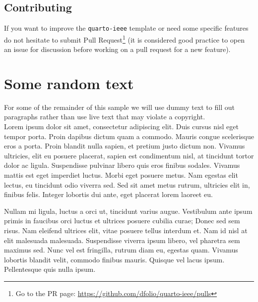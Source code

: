 \documentclass[
  journal,
]{IEEEtran}%
\theoremstyle{plain}
\theoremstyle{remark}
\begin{document}
\subsection{Contributing}\label{contributing}

If you want to improve the \texttt{quarto-ieee} template or need some
specific features do not hesitate to submit Pull Request\footnote{Go to
  the PR page: \url{https://github.com/dfolio/quarto-ieee/pulls}} (it is
considered good practice to open an issue for discussion before working
on a pull request for a new feature).

\section{Some random text}\label{some-random-text}

For some of the remainder of this sample we will use dummy text to fill
out paragraphs rather than use live text that may violate a copyright.
\IEEEpubidadjcol\\
Lorem ipsum dolor sit amet, consectetur adipiscing elit. Duis cursus
nisl eget tempor porta. Proin dapibus dictum quam a commodo. Mauris
congue scelerisque eros a porta. Proin blandit nulla sapien, et pretium
justo dictum non. Vivamus ultricies, elit eu posuere placerat, sapien
est condimentum nisl, at tincidunt tortor dolor ac ligula. Suspendisse
pulvinar libero quis eros finibus sodales. Vivamus mattis est eget
imperdiet luctus. Morbi eget posuere metus. Nam egestas elit lectus, eu
tincidunt odio viverra sed. Sed sit amet metus rutrum, ultricies elit
in, finibus felis. Integer lobortis dui ante, eget placerat lorem
laoreet eu.

Nullam mi ligula, luctus a orci ut, tincidunt varius augue. Vestibulum
ante ipsum primis in faucibus orci luctus et ultrices posuere cubilia
curae; Donec sed sem risus. Nam eleifend ultrices elit, vitae posuere
tellus interdum et. Nam id nisl at elit malesuada malesuada. Suspendisse
viverra ipsum libero, vel pharetra sem maximus sed. Nunc vel est
fringilla, rutrum diam eu, egestas quam. Vivamus lobortis blandit velit,
commodo finibus mauris. Quisque vel lacus ipsum. Pellentesque quis nulla
ipsum.
\end{document}
